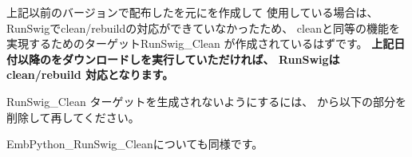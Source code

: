 \medskip
上記以前のバージョンで配布したを元に\QCMakeLists{}を作成して
使用している場合は、 RunSwigでclean/rebuildの対応ができていなかったため、
cleanと同等の機能を実現するためのターゲットRunSwig\_Clean が作成されているはずです。
\bf{上記日付以降の\SprLib をダウンロードし\cmake を実行していただければ、
RunSwigはclean/rebuild 対応となります。}


RunSwig\_Clean ターゲットを生成されないようにするには、
\QCMakeLists{}から以下の部分を削除して再\cmake してください。

\begin{narrow}\begin{figure}[h]
    \begin{narrow}[30pt]
	\begin{center}\end{center}
	\label{fig:SpringheadLibraryTree}
    \end{narrow}
\end{figure}\end{narrow}
	
EmbPython\_RunSwig\_Cleanについても同様です。	

